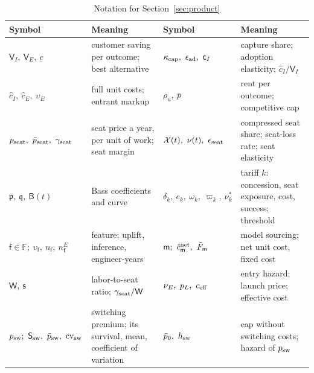 \begin{table}[t]
\centering
\caption{Notation for Section~\ref{sec:product}}\label{tab:prod-notation}
\footnotesize
\begin{tabular}{@{}lp{4.9cm}@{\quad}lp{4.6cm}@{}}
\toprule
Symbol & Meaning & Symbol & Meaning\\
\midrule
$\mathsf V_I,\ \mathsf V_E,\ \underline c$ & customer saving per outcome; best alternative & $\kappa_{\rm cap},\ \epsilon_{\rm ad},\ \mathsf c_I$ & capture share; adoption elasticity; $\hat c_I/\mathsf V_I$\\
$\hat c_I,\ \hat c_E,\ \upsilon_E$ & full unit costs; entrant markup & $\rho_u,\ \bar p$ & rent per outcome; competitive cap\\
$p_{\rm seat},\ \bar p_{\rm seat},\ \gamma_{\rm seat}$ & seat price a year, per unit of work; seat margin & $\mathcal X(t),\ \nu(t),\ \epsilon_{\rm seat}$ & compressed seat share; seat-loss rate; seat elasticity\\
$\mathfrak p,\ \mathfrak q,\ \mathsf B(t)$ & Bass coefficients and curve & $\delta_k,\ e_k,\ \omega_k,\ \varpi_k,\ \nu^*_k$ & tariff $k$: concession, seat exposure, cost, success; threshold\\
$\mathsf f\in\mathbb F;\ \upsilon_{\mathsf f},\ n_{\mathsf f},\ n^E_{\mathsf f}$ & feature; uplift, inference, engineer-years & $\mathsf m;\ \hat c^{\rm net}_{\mathsf m},\ \tilde F_{\mathsf m}$ & model sourcing; net unit cost, fixed cost\\
$\mathsf W,\ \mathsf s$ & labor-to-seat ratio; $\gamma_{\rm seat}/\mathsf W$ & $\nu_E,\ p_L,\ c_{\rm eff}$ & entry hazard; launch price; effective cost\\
$p_{\rm sw};\ \mathsf S_{\rm sw},\ \bar p_{\rm sw},\ \mathrm{cv}_{\rm sw}$ & switching premium; its survival, mean, coefficient of variation & $\bar p_0,\ h_{\rm sw}$ & cap without switching costs; hazard of $p_{\rm sw}$\\
\bottomrule
\end{tabular}
\end{table}

